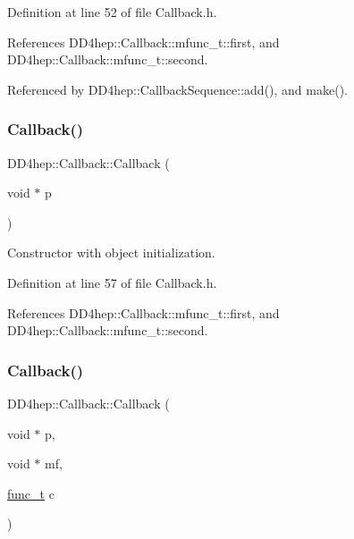 Definition at line 52 of file Callback.\+h.



References D\+D4hep\+::\+Callback\+::mfunc\+\_\+t\+::first, and D\+D4hep\+::\+Callback\+::mfunc\+\_\+t\+::second.



Referenced by D\+D4hep\+::\+Callback\+Sequence\+::add(), and make().

\hypertarget{class_d_d4hep_1_1_callback_a11bd26d9c2634ea669f13d30d1462f8e}{}\label{class_d_d4hep_1_1_callback_a11bd26d9c2634ea669f13d30d1462f8e} 
\subsubsection{\texorpdfstring{Callback()}{Callback()}\hspace{0.1cm}{\footnotesize\ttfamily [2/3]}}
{\footnotesize\ttfamily D\+D4hep\+::\+Callback\+::\+Callback (\begin{DoxyParamCaption}\item[{void $\ast$}]{p }\end{DoxyParamCaption})\hspace{0.3cm}{\ttfamily [inline]}}



Constructor with object initialization. 



Definition at line 57 of file Callback.\+h.



References D\+D4hep\+::\+Callback\+::mfunc\+\_\+t\+::first, and D\+D4hep\+::\+Callback\+::mfunc\+\_\+t\+::second.

\hypertarget{class_d_d4hep_1_1_callback_ad9377008515da7c31829f8f1c77c0be8}{}\label{class_d_d4hep_1_1_callback_ad9377008515da7c31829f8f1c77c0be8} 
\subsubsection{\texorpdfstring{Callback()}{Callback()}\hspace{0.1cm}{\footnotesize\ttfamily [3/3]}}
{\footnotesize\ttfamily D\+D4hep\+::\+Callback\+::\+Callback (\begin{DoxyParamCaption}\item[{void $\ast$}]{p,  }\item[{void $\ast$}]{mf,  }\item[{\hyperlink{class_d_d4hep_1_1_callback_a1f07e4c890067fde0b3ff1ad94e72a34}{func\+\_\+t}}]{c }\end{DoxyParamCaption})\hspace{0.3cm}{\ttfamily [inline]}}



